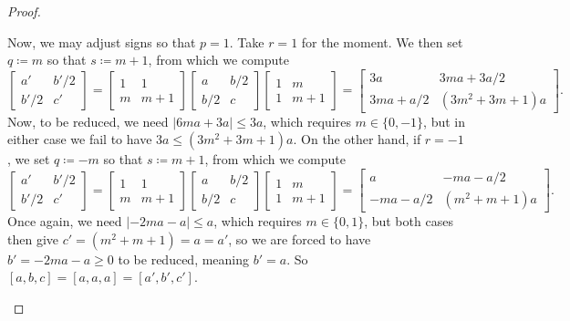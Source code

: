 \documentclass[../notes.tex]{subfiles}
\begin{document}
\begin{proof}
\begin{itemize}
		Now, we may adjust signs so that $p=1$. Take $r=1$ for the moment. We then set $q\coloneqq m$ so that $s\coloneqq m+1$, from which we compute
		\[\begin{bmatrix}
			a' & b'/2 \\
			b'/2 & c'
		\end{bmatrix}=\begin{bmatrix}
			1 & 1 \\
			m & m+1
		\end{bmatrix}\begin{bmatrix}
			a & b/2 \\
			b/2 & c
		\end{bmatrix}\begin{bmatrix}
			1 & m \\
			1 & m+1
		\end{bmatrix}=\begin{bmatrix}
			3a & 3ma+3a/2 \\
			3ma+a/2 & \left(3m^2+3m+1\right)a
		\end{bmatrix}.\]
		Now, to be reduced, we need $\left|6ma+3a\right|\le3a$, which requires $m\in\{0,-1\}$, but in either case we fail to have $3a\le\left(3m^2+3m+1\right)a$. On the other hand, if $r=-1$, we set $q\coloneqq-m$ so that $s\coloneqq m+1$, from which we compute
		\[\begin{bmatrix}
			a' & b'/2 \\
			b'/2 & c'
		\end{bmatrix}=\begin{bmatrix}
			1 & 1 \\
			m & m+1
		\end{bmatrix}\begin{bmatrix}
			a & b/2 \\
			b/2 & c
		\end{bmatrix}\begin{bmatrix}
			1 & m \\
			1 & m+1
		\end{bmatrix}=\begin{bmatrix}
			a & -ma-a/2 \\
			-ma-a/2 & \left(m^2+m+1\right)a
		\end{bmatrix}.\]
		Once again, we need $\left|-2ma-a\right|\le a$, which requires $m\in\{0,1\}$, but both cases then give $c'=\left(m^2+m+1\right)=a=a'$, so we are forced to have $b'=-2ma-a\ge0$ to be reduced, meaning $b'=a$. So $[a,b,c]=[a,a,a]=[a',b',c']$.
		\qedhere
	\end{itemize}
\end{proof}
\end{document}
